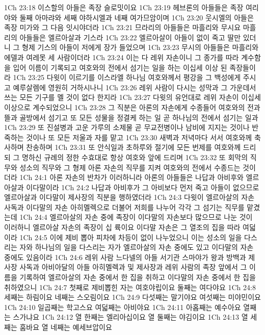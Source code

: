 1Ch 23:18  이스할의 아들은 족장 슬로밋이요
1Ch 23:19  헤브론의 아들들은 족장 여리야와 둘째 아마랴와 세째 야하시엘과 네째 여가므암이며
1Ch 23:20  웃시엘의 아들은 족장 미가와 그 다음 잇시야더라
1Ch 23:21  므라리의 아들들은 마흘리와 무시요 마흘리의 아들들은 엘르아살과 기스라
1Ch 23:22  엘르아살이 아들이 없이 죽고 딸만 있더니 그 형제 기스의 아들이 저에게 장가 들었으며
1Ch 23:23  무시의 아들들은 마흘리와 에델과 여레못 세 사람이더라
1Ch 23:24  이는 다 레위 자손이니 그 종가를 따라 계수함을 입어 이름이 기록되고 여호와의 전에서 섬기는 일을 하는 이십세 이상 된 족장들이라
1Ch 23:25  다윗이 이르기를 이스라엘 하나님 여호와께서 평강을 그 백성에게 주시고 예루살렘에 영원히 거하시나니
1Ch 23:26  레위 사람이 다시는 성막과 그 가운데서 쓰는 모든 기구를 멜 것이 없다 한지라
1Ch 23:27  다윗의 유언대로 레위 자손이 이십세 이상으로 계수되었으니
1Ch 23:28  그 직분은 아론의 자손에게 수종들어 여호와의 전과 뜰과 골방에서 섬기고 또 모든 성물을 정결케 하는 일 곧 하나님의 전에서 섬기는 일과
1Ch 23:29  또 진설병과 고운 가루의 소제물 곧 무교전병이나 남비에 지지는 것이나 반죽하는 것이나 또 모든 저울과 자를 맡고
1Ch 23:30  새벽과 저녁마다 서서 여호와께 축사하며 찬송하며
1Ch 23:31  또 안식일과 초하루와 절기에 모든 번제를 여호와께 드리되 그 명하신 규례의 정한 수효대로 항상 여호와 앞에 드리며
1Ch 23:32  또 회막의 직무와 성소의 직무와 그 형제 아론 자손의 직무를 지켜 여호와의 전에서 수종드는 것이더라
1Ch 24:1  아론 자손의 반차가 이러하니라 아론의 아들들은 나답과 아비후와 엘르아살과 이다말이라
1Ch 24:2  나답과 아비후가 그 아비보다 먼저 죽고 아들이 없으므로 엘르아살과 이다말이 제사장의 직분을 행하였더라
1Ch 24:3  다윗이 엘르아살의 자손 사독과 이다말의 자손 아히멜렉으로 더불어 저희를 나누어 각각 그 섬기는 직무를 맡겼는데
1Ch 24:4  엘르아살의 자손 중에 족장이 이다말의 자손보다 많으므로 나눈 것이 이러하니 엘르아살 자손의 족장이 십 륙이요 이다말 자손은 그 열조의 집을 따라 여덟이라
1Ch 24:5  이에 제비 뽑아 피차에 차등이 없이 나누었으니 이는 성소의 일을 다스리는 자와 하나님의 일을 다스리는 자가 엘르아살의 자손 중에도 있고 이다말의 자손 중에도 있음이라
1Ch 24:6  레위 사람 느다넬의 아들 서기관 스마야가 왕과 방백과 제사장 사독과 아비아달의 아들 아히멜렉과 및 제사장과 레위 사람의 족장 앞에서 그 이름을 기록하여 엘르아살의 자손 중에서 한 집을 취하고 이다말의 자손 중에서 한 집을 취하였으니
1Ch 24:7  첫째로 제비뽑힌 자는 여호야립이요 둘째는 여다야요
1Ch 24:8  세째는 하림이요 네째는 스오림이요
1Ch 24:9  다섯째는 말기야요 여섯째는 미야민이요
1Ch 24:10  일곱째는 학고스요 여덟째는 아비야요
1Ch 24:11  아홉째는 예수아요 열째는 스가냐요
1Ch 24:12  열 한째는 엘리아십이요 열 둘째는 야김이요
1Ch 24:13  열 세째는 훔바요 열 네째는 예세브압이요
